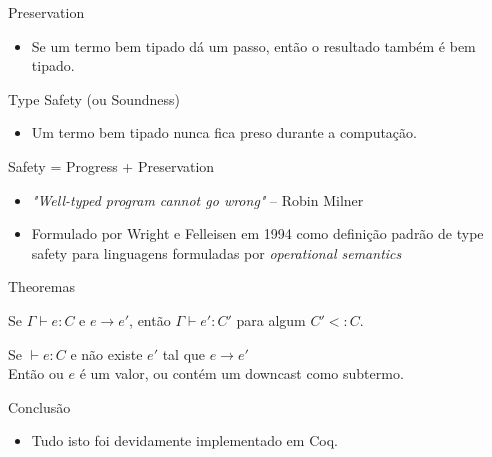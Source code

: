 \documentclass{beamer}
\begin{document}
    \begin{frame}{Preservation}
        \begin{itemize}
            \item Se um termo bem tipado dá um passo, então o resultado também é bem tipado.
        \end{itemize}
    \end{frame}

    \begin{frame}{Type Safety (ou Soundness)}
        \begin{itemize}
            \item Um termo bem tipado nunca fica preso durante a computação.
        \end{itemize}
    \end{frame}

    \begin{frame}{Safety = Progress + Preservation}
        \begin{itemize}
            \item \emph{"Well-typed program cannot go wrong"} -- Robin Milner 

            \item<2-> Formulado por Wright e Felleisen em 1994 como definição padrão de
            type safety para linguagens formuladas por \emph{operational semantics}
        \end{itemize}
    \end{frame}


    \begin{frame}{Theoremas}
        \begin{theorem}[Preservation]
            Se $\Gamma \vdash e : C$ e $e \rightarrow e'$,
            então $\Gamma \vdash e': C'$ para algum $C' <: C$.
        \end{theorem}
        \begin{theorem}[Progress]
            Se $\vdash e : C$ e não existe $e'$ tal que $e \rightarrow e'$\\
            Então ou $e$ é um valor, ou contém um downcast como subtermo.
        \end{theorem}
    \end{frame}

    \begin{frame}{Conclusão}
        \begin{itemize}
            \item Tudo isto foi devidamente implementado em Coq.
        \end{itemize}
    \end{frame}
\end{document}
